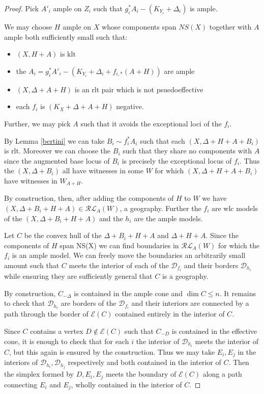 \documentclass[a4paper,12pt]{amsart}
\begin{document}
\begin{proof}

	Pick $A'_{i}$ ample on $Z_{i}$ such that $g_{i}^{*}A_{i}-(K_{Y_{i}}+\Delta_{i})$ is ample. 
	
	We may choose $H$ ample on $X$ whose components span $NS(X)$ together with $A$ ample both sufficiently small such that:
	\begin{itemize}
		\item $(X,H+A)$ is klt
		\item the $A_{i} = g_{i}^{*}A'_{i}-(K_{Y_{i}}+\Delta_{i}+f_{i,*}(A+H))$ are ample
		\item $(X,\Delta+A+H)$ is an rlt pair which is not psuedoeffective
		\item each $f_{i}$ is $(K_{X}+\Delta+A+H)$ negative.
	\end{itemize}

	Further, we may pick $A$ such that it avoids the exceptional loci of the $f_{i}$.
	
	By Lemma \ref{bertini} we can take $B_{i} \sim f_{i}^{*}A_{i}$ such that each $(X,\Delta+H+A+B_{i})$ is rlt. Moreover we can choose the $B_{i}$ such that they share no components with $A$ since the augmented base locus of $B_{i}$ is precisely the exceptional locus of $f_{i}$. Thus the $(X,\Delta+B_{i})$ all have witnesses in some $W$ for which $(X,\Delta+H+A+B_{i})$ have witnesses in $W_{A+H}$.
	
	By construction, then, after adding the components of $H$ to $W$ we have $(X,\Delta+B_{i}+H+A) \in \mathcal{RL}_{A}(W)$, a geography. Further the $f_{i}$ are wlc models of the $(X,\Delta+B_{i}+H+A)$ and the $h_{i}$ are the ample models.
	
	Let $C$ be the convex hull of the $\Delta+B_{i}+H+A$ and $\Delta+H+A$. Since the components of $H$ span NS(X) we can find boundaries in $\mathcal{RL}_{A}(W)$ for which the $f_{i}$ is an ample model. We can freely move the boundaries an arbitrarily small amount such that $C$ meets the interior of each of the $\mathcal{D}_{f_{i}}$ and their borders $\mathcal{D}_{h_{i}}$ while ensuring they are sufficiently general that $C$ is a geography. 
	
	By construction, $C_{-\Delta}$ is contained in the ample cone and $\dim C \leq n$. It remains to check that $\mathcal{D}_{h_{i}}$ are borders of the $\mathcal{D}_{f_{i}}$ and their interiors are connected by a path through the border of $\mathcal{E}(C)$ contained entirely in the interior of $C$.
	
	Since $C$ contains a vertex $D \notin \mathcal{E}(C)$ such that $C_{-D}$ is contained in the effective cone, it is enough to check that for each $i$ the interior of $\mathcal{D}_{h_{i}}$ meets the interior of $C$, but this again is ensured by the construction. Thus we may take $E_{i},E_{j}$ in the interiors of $\mathcal{D}_{h_{i}},\mathcal{D}_{h_{j}}$ respectively and both contained in the interior of $C$. Then the simplex formed by $D,E_{i},E_{j}$ meets the boundary of $\mathcal{E}(C)$ along a path connecting $E_{i}$ and $E_{j}$, wholly contained in the interior of $C$.

\end{proof}
\end{document}
